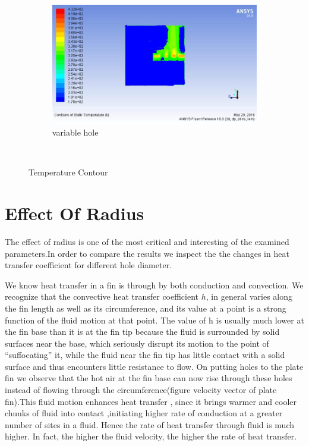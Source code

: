 \begin{figure}[h]
\begin{subfigure}[b]{0.5\textwidth}
 		\includegraphics[width=\textwidth]{125.jpg}
 		\caption{variable hole}
 		\label{fig:unstructured}
 	\end{subfigure}
 	
 	~ %
 	\caption{Temperature Contour }\label{fig:Meshing}
 \end{figure}



\section{Effect Of Radius}

                       The effect of radius is one of the most critical and interesting of the examined parameters.In order to compare the results we inspect the the changes in heat transfer coefficient for different hole diameter.
                       
                       We know heat transfer in a fin is through by both conduction and convection. We recognize that the convective heat transfer coefficient $h$, in general varies along the fin length as well as its circumference, and its value at a point is a strong function of the fluid motion at that point. The value of h is usually much lower at the fin base than it is at the fin tip because the fluid is surrounded by solid surfaces near the base, which seriously disrupt its motion to the point of “suffocating” it, while the fluid near the fin tip has little contact with a solid surface and thus encounters little resistance to flow.
                       On putting holes to the plate fin we observe that the hot air at the fin base can now rise through these holes instead of flowing through the circumference(figure velocity vector of plate fin).This fluid motion enhances heat transfer , since it brings warmer and cooler chunks of fluid into contact ,initiating higher rate of conduction at a greater number of sites in a fluid. Hence the rate of heat transfer through fluid is much higher. In fact, the higher the fluid velocity, the higher the rate of heat transfer.  

